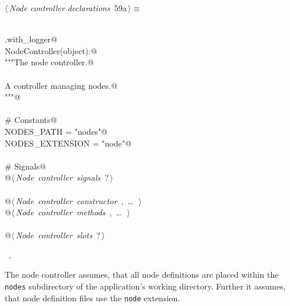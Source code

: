 \documentclass[
    a4paper,      %
    10pt,         %
    openright,    %
    notitlepage,  %
    parskip=half, %
]{scrreprt}       %
\theoremstyle{definition}                    %
\begin{document}
\begin{flushleft} \small
\begin{minipage}{\linewidth}\label{scrap97}\raggedright\small
{} $\langle\,${\itshape Node controller declarations}\nobreak\ {\footnotesize {59a}}$\,\rangle\equiv$
\vspace{-1exm}
\begin{list}{}{} \item
\mbox{}\lstinline@@\\
\mbox{}\lstinline@common.with_logger@\\
\mbox{}\lstinline@class NodeController(object):@\\
\mbox{}\lstinline@    """The node controller.@\\
\mbox{}\lstinline@@\\
\mbox{}\lstinline@    A controller managing nodes.@\\
\mbox{}\lstinline@    """@\\
\mbox{}\lstinline@@\\
\mbox{}\lstinline@    # Constants@\\
\mbox{}\lstinline@    NODES_PATH = "nodes"@\\
\mbox{}\lstinline@    NODES_EXTENSION = "node"@\\
\mbox{}\lstinline@@\\
\mbox{}\lstinline@    # Signals@\\
\mbox{}\lstinline@    @\hbox{$\langle\,${\itshape Node controller signals}\nobreak\ {\footnotesize ?}$\,\rangle$}\lstinline@@\\
\mbox{}\lstinline@@\\
\mbox{}\lstinline@    @\hbox{$\langle\,${\itshape Node controller constructor}\nobreak\ {\footnotesize {}, \ldots\ }$\,\rangle$}\lstinline@@\\
\mbox{}\lstinline@    @\hbox{$\langle\,${\itshape Node controller methods}\nobreak\ {\footnotesize {}, \ldots\ }$\,\rangle$}\lstinline@@\\
\mbox{}\lstinline@@\\
\mbox{}\lstinline@    @\hbox{$\langle\,${\itshape Node controller slots}\nobreak\ {\footnotesize ?}$\,\rangle$}\lstinline@@\\
\mbox{}\lstinline@@{\NWsep}
\end{list}
\vspace{-1.5ex}
\footnotesize
\begin{list}{}{\setlength{\itemsep}{-\parsep}\setlength{\itemindent}{-\leftmargin}}
\item \NWtxtMacroRefIn\ .

\item{}
\end{list}
\end{minipage}\vspace{4ex}
\end{flushleft}
The node controller assumes, that all node definitions are placed within the
\verb+nodes+ subdirectory of the application's working directory. Further it
assumes, that node definition files use the \verb+node+ extension.
\end{document}
